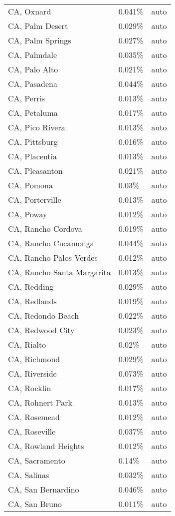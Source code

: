 \begin{longtable}[]{@{}lll@{}}
CA, Oxnard & 0.041\% & auto \\
CA, Palm Desert & 0.029\% & auto \\
CA, Palm Springs & 0.027\% & auto \\
CA, Palmdale & 0.035\% & auto \\
CA, Palo Alto & 0.021\% & auto \\
CA, Pasadena & 0.044\% & auto \\
CA, Perris & 0.013\% & auto \\
CA, Petaluma & 0.017\% & auto \\
CA, Pico Rivera & 0.013\% & auto \\
CA, Pittsburg & 0.016\% & auto \\
CA, Placentia & 0.013\% & auto \\
CA, Pleasanton & 0.021\% & auto \\
CA, Pomona & 0.03\% & auto \\
CA, Porterville & 0.013\% & auto \\
CA, Poway & 0.012\% & auto \\
CA, Rancho Cordova & 0.019\% & auto \\
CA, Rancho Cucamonga & 0.044\% & auto \\
CA, Rancho Palos Verdes & 0.012\% & auto \\
CA, Rancho Santa Margarita & 0.013\% & auto \\
CA, Redding & 0.029\% & auto \\
CA, Redlands & 0.019\% & auto \\
CA, Redondo Beach & 0.022\% & auto \\
CA, Redwood City & 0.023\% & auto \\
CA, Rialto & 0.02\% & auto \\
CA, Richmond & 0.029\% & auto \\
CA, Riverside & 0.073\% & auto \\
CA, Rocklin & 0.017\% & auto \\
CA, Rohnert Park & 0.013\% & auto \\
CA, Rosemead & 0.012\% & auto \\
CA, Roseville & 0.037\% & auto \\
CA, Rowland Heights & 0.012\% & auto \\
CA, Sacramento & 0.14\% & auto \\
CA, Salinas & 0.032\% & auto \\
CA, San Bernardino & 0.046\% & auto \\
CA, San Bruno & 0.011\% & auto \\

\end{longtable}
